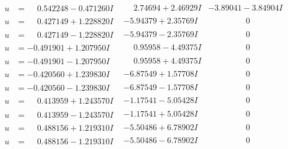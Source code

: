 \documentclass[1p]{elsarticle_modified}
\theoremstyle{definition}
\begin{document}
$$\begin{array}{c|c|c}
\begin{aligned}
u &= \phantom{-}0.542248 - 0.471260 I\end{aligned}
 & \phantom{-}2.74694 + 2.46929 I & -3.89041 - 3.84904 I \\ \hline\begin{aligned}
u &= \phantom{-}0.427149 + 1.228820 I\end{aligned}
 & -5.94379 + 2.35769 I & \phantom{-0.000000 } 0 \\ \hline\begin{aligned}
u &= \phantom{-}0.427149 - 1.228820 I\end{aligned}
 & -5.94379 - 2.35769 I & \phantom{-0.000000 } 0 \\ \hline\begin{aligned}
u &= -0.491901 + 1.207950 I\end{aligned}
 & \phantom{-}0.95958 - 4.49375 I & \phantom{-0.000000 } 0 \\ \hline\begin{aligned}
u &= -0.491901 - 1.207950 I\end{aligned}
 & \phantom{-}0.95958 + 4.49375 I & \phantom{-0.000000 } 0 \\ \hline\begin{aligned}
u &= -0.420560 + 1.239830 I\end{aligned}
 & -6.87549 + 1.57708 I & \phantom{-0.000000 } 0 \\ \hline\begin{aligned}
u &= -0.420560 - 1.239830 I\end{aligned}
 & -6.87549 - 1.57708 I & \phantom{-0.000000 } 0 \\ \hline\begin{aligned}
u &= \phantom{-}0.413959 + 1.243570 I\end{aligned}
 & -1.17541 - 5.05428 I & \phantom{-0.000000 } 0 \\ \hline\begin{aligned}
u &= \phantom{-}0.413959 - 1.243570 I\end{aligned}
 & -1.17541 + 5.05428 I & \phantom{-0.000000 } 0 \\ \hline\begin{aligned}
u &= \phantom{-}0.488156 + 1.219310 I\end{aligned}
 & -5.50486 + 6.78902 I & \phantom{-0.000000 } 0 \\ \hline\begin{aligned}
u &= \phantom{-}0.488156 - 1.219310 I\end{aligned}
 & -5.50486 - 6.78902 I & \phantom{-0.000000 } 0 \\ \hline\begin{aligned}

\end{aligned}
\end{array}$$
\end{document}
